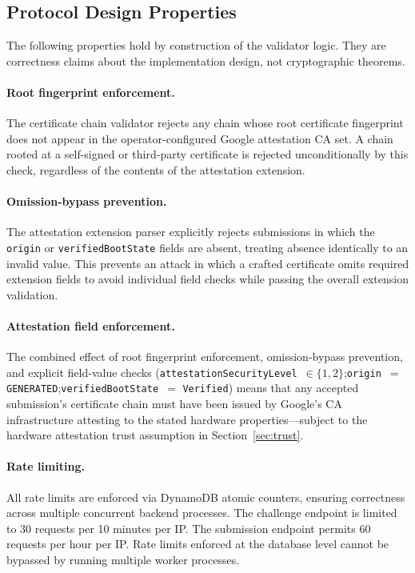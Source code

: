 \documentclass[11pt,a4paper]{article}
\begin{document}
\subsection{Protocol Design Properties}
\label{sec:protocol}

The following properties hold by construction of the validator logic.  They are
correctness claims about the implementation design, not cryptographic theorems.

\paragraph{Root fingerprint enforcement.} The certificate chain validator rejects
any chain whose root certificate fingerprint does not appear in the
operator-configured Google attestation CA set.  A chain rooted at a self-signed
or third-party certificate is rejected unconditionally by this check, regardless
of the contents of the attestation extension.

\paragraph{Omission-bypass prevention.} The attestation extension parser
explicitly rejects submissions in which the \texttt{origin} or
\texttt{verifiedBootState} fields are absent, treating absence identically to an
invalid value.  This prevents an attack in which a crafted certificate omits
required extension fields to avoid individual field checks while passing the
overall extension validation.

\paragraph{Attestation field enforcement.} The combined effect of root
fingerprint enforcement, omission-bypass prevention, and explicit field-value
checks (\texttt{attestationSecurityLevel}~$\in \{1,2\}$;\linebreak[2]
\texttt{origin}~$=$ \texttt{GENERATED};\linebreak[2]
\texttt{verifiedBootState}~$=$ \texttt{Verified}) means that any accepted
submission's certificate chain must have been issued by Google's CA
infrastructure attesting to the stated hardware properties---subject to the
hardware attestation trust assumption in Section~\ref{sec:trust}.

\paragraph{Rate limiting.} All rate limits are enforced via DynamoDB atomic
counters, ensuring correctness across multiple concurrent backend processes.
The challenge endpoint is limited to 30 requests per 10 minutes per IP\@.  The
submission endpoint permits 60 requests per hour per IP\@.  Rate limits enforced
at the database level cannot be bypassed by running multiple worker processes.
\end{document}
